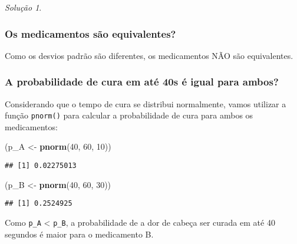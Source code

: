 \documentclass[
]{latex/krantz}
\newenvironment{Shaded}{\begin{snugshade}}{\end{snugshade}}
\newcommand{\DecValTok}[1]{\textcolor[rgb]{0.00,0.00,0.81}{#1}}
\newcommand{\FunctionTok}[1]{\textcolor[rgb]{0.13,0.29,0.53}{\textbf{#1}}}
\newcommand{\NormalTok}[1]{#1}
\newcommand{\OtherTok}[1]{\textcolor[rgb]{0.56,0.35,0.01}{#1}}
\theoremstyle{definition}
\theoremstyle{definition}
\theoremstyle{definition}
\theoremstyle{definition}
\theoremstyle{remark}
\newtheorem*{solution}{Solução}
\begin{document}
\begin{solution}
\leavevmode

\hypertarget{os-medicamentos-suxe3o-equivalentes}{%
\subsubsection*{Os medicamentos são equivalentes?}\label{os-medicamentos-suxe3o-equivalentes}}

Como os desvios padrão são diferentes, os medicamentos NÃO são equivalentes.

\hypertarget{a-probabilidade-de-cura-em-atuxe9-40s-uxe9-igual-para-ambos}{%
\subsubsection*{A probabilidade de cura em até 40s é igual para ambos?}\label{a-probabilidade-de-cura-em-atuxe9-40s-uxe9-igual-para-ambos}}

Considerando que o tempo de cura se distribui normalmente, vamos utilizar a função \texttt{pnorm()} para calcular a probabilidade de cura para ambos os medicamentos:

\begin{Shaded}
\begin{Highlighting}[]
\NormalTok{(p\_A }\OtherTok{\textless{}{-}} \FunctionTok{pnorm}\NormalTok{(}\DecValTok{40}\NormalTok{, }\DecValTok{60}\NormalTok{, }\DecValTok{10}\NormalTok{))}
\end{Highlighting}
\end{Shaded}

\begin{verbatim}
## [1] 0.02275013
\end{verbatim}

\begin{Shaded}
\begin{Highlighting}[]
\NormalTok{(p\_B }\OtherTok{\textless{}{-}} \FunctionTok{pnorm}\NormalTok{(}\DecValTok{40}\NormalTok{, }\DecValTok{60}\NormalTok{, }\DecValTok{30}\NormalTok{))}
\end{Highlighting}
\end{Shaded}

\begin{verbatim}
## [1] 0.2524925
\end{verbatim}

Como \texttt{p\_A} \textless{} \texttt{p\_B}, a probabilidade de a dor de cabeça ser curada em até 40 segundos é maior para o medicamento B.


\end{solution}
\end{document}
